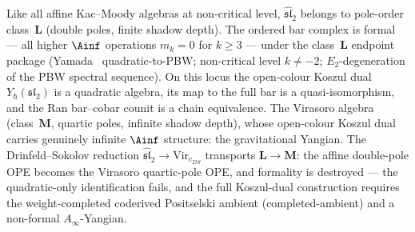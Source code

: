 \begin{remark}
\label{rem:sl2-formality}
Like all affine Kac--Moody algebras at non-critical level,
$\widehat{\mathfrak{sl}}_2$ belongs to pole-order class~$\mathbf L$
(double poles, finite shadow depth). The ordered bar complex is
formal — all higher $\Ainf$ operations $m_k=0$ for $k\ge 3$ — under
the class~$\mathbf L$ endpoint package
(Yamada~\cite{Yamada89} quadratic-to-PBW; non-critical level
$k\neq -2$; $E_2$-degeneration of the PBW spectral sequence). On
this locus the open-colour Koszul dual $Y_\hbar(\mathfrak{sl}_2)$ is
a quadratic algebra, its map to the full bar is a quasi-isomorphism,
and the Ran bar--cobar counit is a chain equivalence.  The Virasoro
algebra (class~$\mathbf M$, quartic poles, infinite shadow depth),
whose open-colour Koszul dual carries genuinely infinite $\Ainf$
structure: the gravitational Yangian. The Drinfeld--Sokolov
reduction $\widehat{\mathfrak{sl}}_2\to\mathrm{Vir}_{c_{DS}}$
transports $\mathbf L\to\mathbf M$: the affine double-pole OPE
becomes the Virasoro quartic-pole OPE, and formality is destroyed
— the quadratic-only identification fails, and the full Koszul-dual
construction requires the weight-completed coderived Positselski
ambient (completed-ambient) and a non-formal $A_\infty$-Yangian.
\end{remark}
